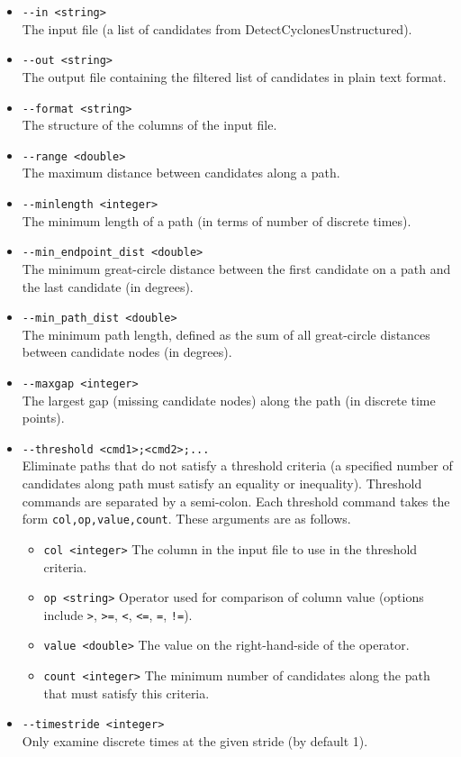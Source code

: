 \documentclass[gmdd, hvmath]{copernicus}
\begin{document}
\begin{itemize}
\item[] \texttt{-\;\!\!-in <string>} \\ The input file (a list of candidates from DetectCyclonesUnstructured).
\item[] \texttt{-\;\!\!-out <string>} \\ The output file containing the filtered list of candidates in plain text format.
\item[] \texttt{-\;\!\!-format <string>} \\ The structure of the columns of the input file.
\item[] \texttt{-\;\!\!-range <double>} \\ The maximum distance between candidates along a path.
\item[] \texttt{-\;\!\!-minlength <integer>} \\ The minimum length of a path (in terms of number of discrete times).
\item[] \texttt{-\;\!\!-min\_endpoint\_dist <double>} \\ The minimum great-circle distance between the first candidate on a path and the last candidate (in degrees).
\item[] \texttt{-\;\!\!-min\_path\_dist <double>} \\ The minimum path length, defined as the sum of all great-circle distances between candidate nodes (in degrees).
\item[] \texttt{-\;\!\!-maxgap <integer>} \\ The largest gap (missing candidate nodes) along the path (in discrete time points).
\item[] \texttt{-\;\!\!-threshold <cmd1>;<cmd2>;...} \\  Eliminate paths that do not satisfy a threshold criteria (a specified number of candidates along path must satisfy an equality or inequality).  Threshold commands are separated by a semi-colon.  Each threshold command takes the form \texttt{col,op,value,count}.  These arguments are as follows.
\begin{itemize}
\item[] \texttt{col <integer>}  The column in the input file to use in the threshold criteria.
\item[] \texttt{op <string>}  Operator used for comparison of column value (options include \texttt{>}, \texttt{>=}, \texttt{<}, \texttt{<=}, \texttt{=}, \texttt{!=}).
\item[] \texttt{value <double>}  The value on the right-hand-side of the operator. 
\item[] \texttt{count <integer>}  The minimum number of candidates along the path that must satisfy this criteria.
\end{itemize}
\item[] \texttt{-\;\!\!-timestride <integer>} \\ Only examine discrete times at the given stride (by default 1).
\end{itemize}
\end{document}
